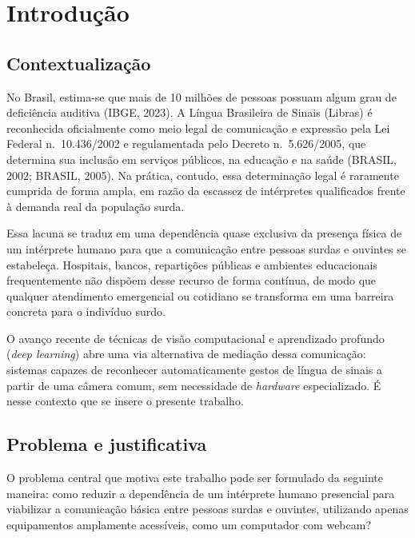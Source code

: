 \section{Introdução}

\subsection{Contextualização}

No Brasil, estima-se que mais de 10 milhões de pessoas possuam algum grau de
deficiência auditiva (IBGE, 2023). A Língua Brasileira de Sinais (Libras) é
reconhecida oficialmente como meio legal de comunicação e expressão pela Lei
Federal n.\ 10.436/2002 e regulamentada pelo Decreto n.\ 5.626/2005, que
determina sua inclusão em serviços públicos, na educação e na saúde (BRASIL,
2002; BRASIL, 2005). Na prática, contudo, essa determinação legal é raramente
cumprida de forma ampla, em razão da escassez de intérpretes qualificados frente
à demanda real da população surda.

Essa lacuna se traduz em uma dependência quase exclusiva da presença física de um
intérprete humano para que a comunicação entre pessoas surdas e ouvintes se
estabeleça. Hospitais, bancos, repartições públicas e ambientes educacionais
frequentemente não dispõem desse recurso de forma contínua, de modo que qualquer
atendimento emergencial ou cotidiano se transforma em uma barreira concreta para
o indivíduo surdo.

O avanço recente de técnicas de visão computacional e aprendizado profundo
(\textit{deep learning}) abre uma via alternativa de mediação dessa comunicação:
sistemas capazes de reconhecer automaticamente gestos de língua de sinais a
partir de uma câmera comum, sem necessidade de \textit{hardware} especializado. É
nesse contexto que se insere o presente trabalho.

\subsection{Problema e justificativa}

O problema central que motiva este trabalho pode ser formulado da seguinte
maneira: como reduzir a dependência de um intérprete humano presencial para
viabilizar a comunicação básica entre pessoas surdas e ouvintes, utilizando
apenas equipamentos amplamente acessíveis, como um computador com webcam?

